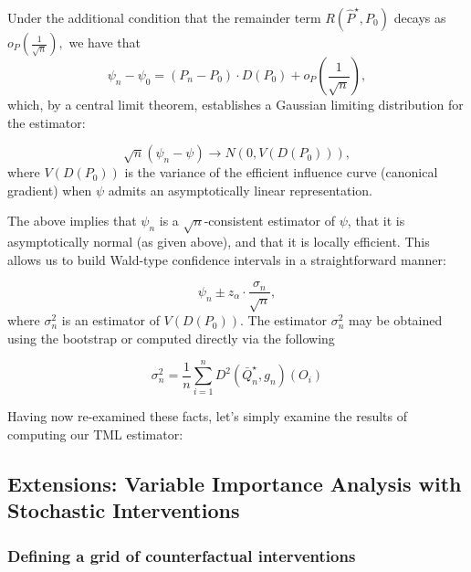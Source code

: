 \documentclass[12pt, krantz2,]{krantz}
\theoremstyle{definition}
\theoremstyle{definition}
\theoremstyle{definition}
\newcommand{\1}{\mathbbm{1}}
\begin{document}
Under the additional condition that the remainder term \(R(\hat{P}^{\star}, P_0)\)
decays as \(o_P \left( \frac{1}{\sqrt{n}} \right),\) we have that
\[\psi_n - \psi_0 = (P_n - P_0) \cdot D(P_0) + o_P \left( \frac{1}{\sqrt{n}}
\right),\]
which, by a central limit theorem, establishes a Gaussian limiting distribution
for the estimator:

\[\sqrt{n}(\psi_n - \psi) \to N(0, V(D(P_0))),\]
where \(V(D(P_0))\) is the variance of the efficient influence curve (canonical
gradient) when \(\psi\) admits an asymptotically linear representation.

The above implies that \(\psi_n\) is a \(\sqrt{n}\)-consistent estimator of \(\psi\),
that it is asymptotically normal (as given above), and that it is locally
efficient. This allows us to build Wald-type confidence intervals in a
straightforward manner:

\[\psi_n \pm z_{\alpha} \cdot \frac{\sigma_n}{\sqrt{n}},\]
where \(\sigma_n^2\) is an estimator of \(V(D(P_0))\). The estimator \(\sigma_n^2\)
may be obtained using the bootstrap or computed directly via the following

\[\sigma_n^2 = \frac{1}{n} \sum_{i = 1}^{n} D^2(\bar{Q}_n^{\star}, g_n)(O_i)\]

Having now re-examined these facts, let's simply examine the results of
computing our TML estimator:

\hypertarget{extensions-variable-importance-analysis-with-stochastic-interventions}{%
\subsection{Extensions: Variable Importance Analysis with Stochastic Interventions}\label{extensions-variable-importance-analysis-with-stochastic-interventions}}

\hypertarget{defining-a-grid-of-counterfactual-interventions}{%
\subsubsection{Defining a grid of counterfactual interventions}\label{defining-a-grid-of-counterfactual-interventions}}
\end{document}
